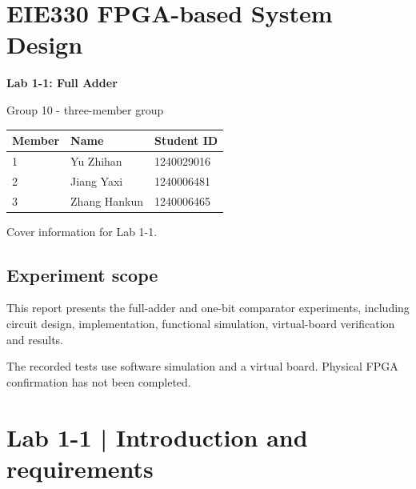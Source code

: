 \documentclass[10pt,a4paper]{article}
\begin{document}
\vspace*{65.1968503937008pt}

\section*{EIE330 FPGA-based System Design}

{\LARGE\bfseries Lab 1-1: Full Adder\par}\vspace{5mm}

Group 10 - three-member group\par

\vspace*{19.84251968503937pt}

\begingroup\small\setlength{\tabcolsep}{4pt}
\renewcommand{\arraystretch}{1.20}
\noindent\begin{tabular}{@{}p{}p{}p{}@{}}
\toprule
\textbf{Member} & \textbf{Name} & \textbf{Student ID} \\
\midrule
1 & Yu Zhihan & 1240029016 \\
2 & Jiang Yaxi & 1240006481 \\
3 & Zhang Hankun & 1240006465 \\
\bottomrule
\end{tabular}\par\endgroup
\vspace{2mm}

{\small\raggedright Cover information for Lab 1-1.\par}

\subsection*{Experiment scope}

This report presents the full-adder and one-bit comparator experiments, including circuit design, implementation, functional simulation, virtual-board verification and results.\par

The recorded tests use software simulation and a virtual board. Physical FPGA confirmation has not been completed.\par

\clearpage

\section*{Lab 1-1 | Introduction and requirements}
\end{document}
